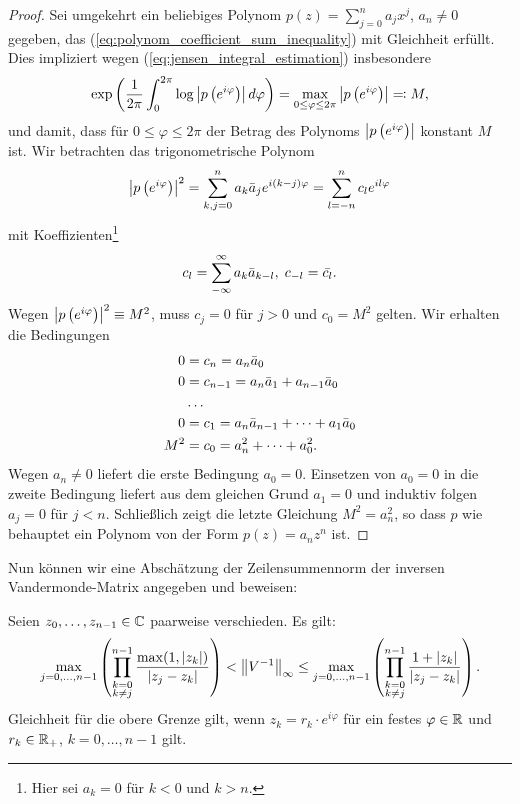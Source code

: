 \begin{proof}
    \noindent Sei umgekehrt  ein beliebiges Polynom
    $p(z) = \sum_{j=0}^n a_j x^j$, $a_n \neq 0$ gegeben, das
    (\ref{eq:polynom_coefficient_sum_inequality}) mit
    Gleichheit erfüllt.
    Dies impliziert wegen (\ref{eq:jensen_integral_estimation}) insbesondere
    \[
        \exp\left( \frac{1}{2\pi} \int_{0}^{2\pi} \log \left\lvert p\left( e^{i\varphi} \right) \right\rvert d\varphi \right)
        = \max_{0 \leq \varphi \leq 2\pi} \left\lvert p\left( e^{i\varphi} \right)  \right\rvert
        \eqqcolon M,
    \]
    und damit, dass für $0 \leq \varphi \leq 2 \pi$ der Betrag des Polynoms
    $\left\lvert p\left( e^{i\varphi} \right) \right\rvert$ konstant $M$ ist.
    Wir betrachten das trigonometrische Polynom
    \[
        \left\lvert p\left( e^{i\varphi} \right) \right\rvert^2
        = \sum_{k,j=0}^n a_k \bar{a}_j e^{i(k-j)\varphi}
        = \sum_{l=-n}^n c_l e^{i l \varphi}
    \]
    mit Koeffizienten\footnote{Hier sei $a_k = 0$ für $k<0$ und $k > n$.}
    \[
        c_l = \sum_{-\infty}^\infty a_k \bar{a}_{k-l}, \; c_{-l} = \bar{c_l}.
    \]
    Wegen $\left\lvert p\left( e^{i\varphi} \right) \right\rvert^2 \equiv M^2$, muss $c_j = 0$ für
    $j > 0$ und $c_0 = M^2$ gelten.
    Wir erhalten die Bedingungen
    \begin{equation*}
        \begin{split}
            0 &= c_n = a_n \bar{a}_0\\
            0 &= c_{n-1} = a_n \bar{a}_1 + a_{n-1} \bar{a}_0\\
              &\dots\\
            0 &= c_1 = a_n \bar{a}_{n-1} + \dots + a_{1} \bar{a}_0\\
            M^2 &= c_0 = a_n^2 + \dots + a_0^2.
        \end{split}
    \end{equation*}
    Wegen $a_n \neq 0$ liefert die erste Bedingung $a_0 = 0$.
    Einsetzen von $a_0 = 0$ in die zweite Bedingung liefert aus dem gleichen
    Grund $a_1 = 0$ und induktiv folgen $a_j = 0$ für $j < n$.
    Schließlich zeigt die letzte Gleichung $M^2 = a_n^2$, so dass $p$ wie
    behauptet ein Polynom von der Form $p(z) = a_n z^n$ ist.

\end{proof}

Nun können wir eine Abschätzung der Zeilensummennorm der inversen
Vandermonde-Matrix angegeben und beweisen:
\begin{theorem}
  \label{thm:inverse_vandermonde_inequality}
  Seien $z_0, \dots, z_{n-1} \in \mathbb{C}$ paarweise verschieden.
  Es gilt:
  \begin{equation}
    \label{eq:inverse_vandermonde_inequality}
    \max_{j = 0, \dots, n-1} \left( \prod_{\substack{k = 0\\ k \neq j}}^{n-1} \frac{\max(1, \left\lvert z_k \right\rvert)}{\left\lvert z_j - z_k \right\rvert} \right)
    < \left\lVert V^{-1} \right\rVert_{\infty}
    \leq \max_{j = 0, \dots, n-1} \left( \prod_{\substack{k = 0\\ k \neq j}}^{n-1} \frac{1 + \left\lvert z_k \right\rvert}{\left\lvert z_j - z_k \right\rvert} \right).
  \end{equation}
  Gleichheit für die obere Grenze gilt, wenn $z_k = r_k \cdot e^{i \varphi}$
  für ein festes $\varphi \in \mathbb{R}$ und $r_k \in \mathbb{R}_{+}$, $k = 0, \dots, n-1$ gilt.
\end{theorem}

